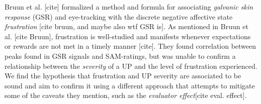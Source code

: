 Bruun et al. [cite] formalized a method and formula for associating
\textit{galvanic skin response} (GSR) and eye-tracking with the discrete
negative affective state \textit{frustration} [cite bruun, and maybe also wtf
GSR is]. As mentioned in Bruun et al. [cite Bruun], frustration is well-studied
and manifests whenever expectations or rewards are not met in a timely manner
[cite]. They found correlation between peaks found in GSR signals and
SAM-ratings, but was unable to confirm a relationship between the
\textit{severity} of a UP and the level of frustration experienced. We find the
hypothesis that frustration and UP severity are associated to be sound and aim
to confirm it using a different approach that attempts to mitigate some of the
caveats they mention, such as the \textit{evaluator effect}[cite eval. effect].



